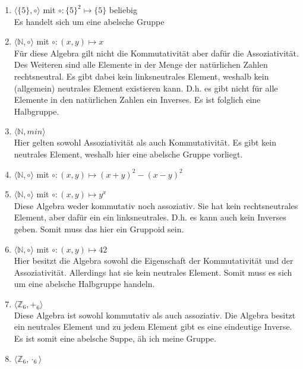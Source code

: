     \begin{enumerate}[label=(\alph*)]
        \item $\langle \{5\}, \circ \rangle$ mit $\circ : \{5\}^2 \mapsto \{5\} $ beliebig \\
        Es handelt sich um eine abelsche Gruppe
        \item $\langle \mathbb{N}, \circ \rangle$ mit $\circ : (x,y) \mapsto x $ \\
        Für diese Algebra gilt nicht die Kommutativität aber dafür die Assoziativität. Des Weiteren sind alle Elemente in der Menge der natürlichen Zahlen rechtsneutral. Es gibt dabei kein linksneutrales Element, weshalb kein (allgemein) neutrales Element existieren kann. D.h. es gibt nicht für alle Elemente in den natürlichen Zahlen ein Inverses. Es ist folglich eine Halbgruppe.
        \item $\langle \mathbb{N}, min \rangle$\\ 
        Hier gelten sowohl Assoziativität als auch Kommutativität. Es gibt kein neutrales Element, weshalb hier eine abelsche Gruppe vorliegt.
        \item $\langle \mathbb{N}, \circ \rangle$ mit $\circ : (x,y) \mapsto (x+y)^2 - (x-y)^2  $ \\
        \item $\langle \mathbb{N}, \circ \rangle$ mit $\circ : (x,y) \mapsto y^x $ \\
        Diese Algebra weder kommutativ noch assoziativ. Sie hat kein rechtsneutrales Element, aber dafür ein ein linksneutrales. D.h. es kann auch kein Inverses geben. Somit muss das hier ein Gruppoid sein.
        \item $\langle \mathbb{N}, \circ \rangle$ mit $\circ : (x,y) \mapsto 42 $ \\
        Hier besitzt die Algebra sowohl die Eigenschaft der Kommutativität und der  Assoziativität. Allerdings hat sie kein neutrales Element. Somit muss es sich um eine abelsche Halbgruppe handeln.
        \item $\langle \mathbb{Z}_6, {+}_6 \rangle$ \\
        Diese Algebra ist sowohl kommutativ als auch assoziativ. Die Algebra besitzt ein neutrales Element und zu jedem Element gibt es eine eindeutige Inverse. Es ist somit eine abelsche Suppe, äh ich meine Gruppe. %
        \item $\langle \mathbb{Z}_6, {\cdot}_6 \rangle$ \\

\end{enumerate}
